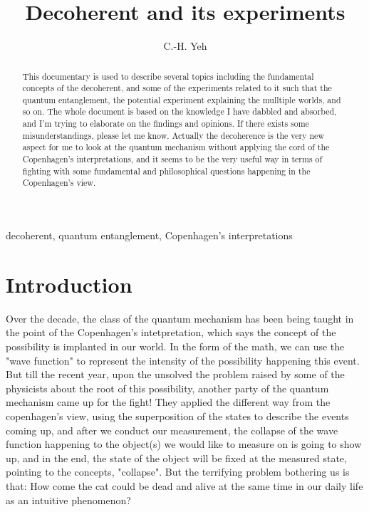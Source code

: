 \documentclass[final,1p,12pt]{elsarticle}
\begin{document}
\begin{frontmatter}

\title{Decoherent and its experiments}

\author[add3]{C.-H. Yeh}



\address[add3]{
Department of Physics and Center for High Energy and High Field Physics, 
National Central University, Chung-Li, Taoyuan City 32001, Taiwan
}





\begin{abstract}
This documentary is used to describe several topics including the fundamental concepts of the decoherent, and some of the experiments related to it such that the quantum entanglement, the potential experiment explaining the mulltiple worlds, and so on. The whole document is based on the knowledge I have dabbled and absorbed, and I'm trying to elaborate on the findings and opinions. If there exists some misunderstandings, please let me know. Actually the decoherence is the very new aspect for me to look at the quantum mechanism without applying the cord of the Copenhagen's interpretations, and it seems to be the very useful way in terms of fighting with some fundamental and philosophical questions happening in the Copenhagen's view. 
\end{abstract}

\begin{keyword}
decoherent, quantum entanglement, Copenhagen's interpretations
\end{keyword}
\end{frontmatter}
\tableofcontents



\section{Introduction}
Over the decade, the class of the quantum mechanism has been being taught in the point of the Copenhagen's intetpretation\cite{Hollowood_2015}, which says the concept of the possibility is implanted in our world. In the form of the math, we can use the "wave function" to represent the intensity of the possibility happening this event. But till the recent year, upon the unsolved the problem raised by some of the physicists about the root of this possibility,  another party of the quantum mechanism came up for the fight! They applied the different way from the copenhagen's view,  using the superposition of the states to describe the events coming up, and after we conduct our measurement, the collapse of the wave function happening to the object(s) we would like to measure on is going to show up, and in the end, the state of the object will be fixed at the measured state, pointing to the concepts, "collapse". But the terrifying problem bothering us is that: How come the cat could be dead and alive at the same time in our daily life as an intuitive phenomenon?\\
\end{document}
